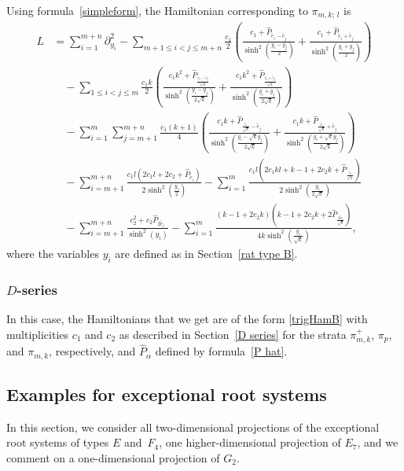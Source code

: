\documentclass[12pt]{amsart}
\numberwithin{equation}{section}
\theoremstyle{definition}
\begin{document}
Using formula~\eqref{simpleform}, the Hamiltonian corresponding to $\pi_{m,k; \, l}$ is
\begin{align*}
    L &= \sum_{i=1}^{m+n} \partial_{y_i}^2 
    - \sum\limits_{m+1 \leq i < j \leq m+n} \frac{c_1}{2} \left(\frac{c_1 + \widehat{P}_{\widetilde{e}_i - \widetilde{e}_j}}{\sinh^2 (\frac{y_i - y_j}{2})} + \frac{c_1 + \widehat{P}_{\widetilde{e}_i + \widetilde{e}_j}}{\sinh^2 (\frac{y_i + y_j}{2})} \right) 
    \\
    &\quad - \sum\limits_{1 \leq i < j \leq m} \frac{c_1 k}{2} \left(\frac{c_1k^2 +  \widehat{P}_{\frac{\widetilde{e}_i - \widetilde{e}_j}{\sqrt{k}}}}{\sinh^2(\frac{y_i - y_j}{2\sqrt{k}})} + \frac{c_1k^2 +  \widehat{P}_{\frac{\widetilde{e}_i + \widetilde{e}_j}{\sqrt{k}}}}{\sinh^2(\frac{y_i + y_j}{2\sqrt{k}})} \right) 
    \\
    &\quad - \sum\limits_{i = 1}^m \sum\limits_{j = m+1}^{m+n} \frac{c_1(k+1)}{4} \left( \frac{c_1 k +  \widehat{P}_{\frac{\widetilde{e}_i}{\sqrt{k}} -\widetilde{e}_j}}{\sinh^2(\frac{y_i - \sqrt{k} y_j}{2 \sqrt{k}})} + 
    \frac{c_1 k +  \widehat{P}_{\frac{\widetilde{e}_i}{\sqrt{k}} + \widetilde{e}_j}}{\sinh^2(\frac{y_i + \sqrt{k} y_j}{2 \sqrt{k}})}\right) 
    \\
    &\quad - \sum\limits_{i = m+1}^{m+n}  \frac{c_1l(2 c_1 l + 2 c_2  +  \widehat{P}_{\widetilde{e}_i})}{2 \sinh^2(\frac{y_i}{2})} 
    -   \sum\limits_{i = 1}^m \frac{ c_1 l \left( 2c_1 kl + k-1 + 2c_2 k + \widehat{P}_{\frac{\widetilde{e}_i}{\sqrt{k}}} \right)}{2 \sinh^2 (\frac{y_i}{2 \sqrt{k}})} 
    \\
    &\quad - \sum\limits_{i = m+1}^{m+n}\frac{c_2^2 + c_2 \widehat{P}_{2\widetilde{e}_i}}{\sinh^2(y_i)} 
    - \sum\limits_{i = 1}^m\frac{(k-1 + 2 c_2k) \left(k-1 + 2c_2k+2\widehat{P}_{\frac{2 \widetilde{e}_i}{\sqrt{k}}}\right)}{4k \sinh^2 (\frac{y_i}{\sqrt{k}})} ,
\end{align*}
where the variables $y_i$ are defined as in Section~\ref{rat type B}.


\subsubsection{$D$-series}
In this case, the Hamiltonians that we get are of the form \eqref{trigHamB} with multiplicities $c_1$ and $c_2$ as described in Section~\ref{D series} for the strata $\pi_{m,k}^+$, $\pi_p$, and $\pi_{m,k}$, respectively, and $\widehat{P}_\alpha$ defined by formula~\eqref{P hat}.



\subsection{Examples for exceptional root systems}
In this section, we consider all two-dimensional
projections of the exceptional root systems of types $E$ and~$F_4$, one higher-dimensional projection of $E_7$, and we comment on a one-dimensional projection of $G_2$.  
\end{document}
